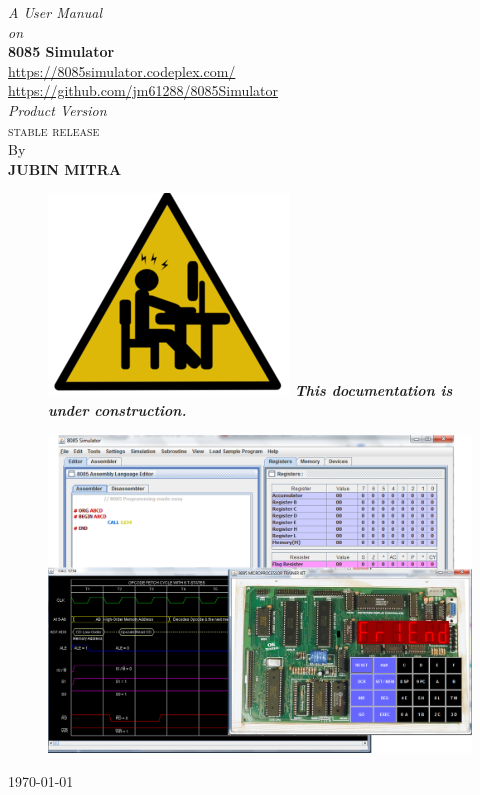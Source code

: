 \thispagestyle{empty}

\begin{center}
\vspace{0.03\textheight}
\textit{A User Manual\\}
\vspace{0.01\textheight}
\textit{on\\}
\vspace{0.03\textheight}
{\Huge\textbf{8085 Simulator
}}\\
{\url{https://8085simulator.codeplex.com/}}\\
{\url{https://github.com/jm61288/8085Simulator}}\\
\vspace{0.015\textheight}
\textit{Product Version \ver}\\
\textsc{stable release}
\vspace{0.015\textheight}
\\By\\
\textbf{\textsc{JUBIN MITRA}}\\
\begin{figure}[htbp]
\centering
\includegraphics[width=0.1\linewidth]{construction}
\textit{\textbf{ This documentation is under construction.}}
\end{figure} 
\vspace{0.03\textheight}
\begin{figure}[H]
\centering

\includegraphics[width=\linewidth]{"./top_page1"}
\end{figure}
\today
\end{center}


